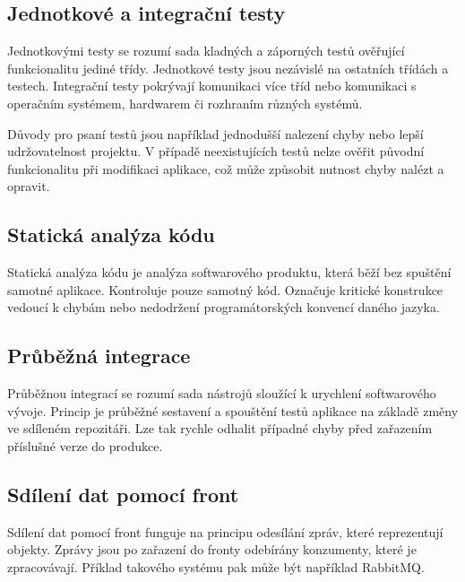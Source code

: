 \documentclass[thesis=B,czech]{FITthesis}[2012/06/26]
\begin{document}
\subsection{Jednotkové a integrační testy}
Jednotkovými testy se rozumí sada kladných a záporných testů ověřující funkcionalitu jediné třídy. Jednotkové testy
jsou nezávislé na ostatních třídách a testech. \cite{testing} 
Integrační testy pokrývají komunikaci více tříd nebo komunikaci s operačním systémem, hardwarem či rozhraním různých systémů. \cite{testing}
\par
Důvody pro psaní testů jsou například jednodušší nalezení chyby nebo lepší udržovatelnost projektu. V případě neexistujících testů nelze ověřit původní
funkcionalitu při modifikaci aplikace, což může způsobit nutnost chyby nalézt a opravit.\cite{testing}

\subsection{Statická analýza kódu}
Statická analýza kódu je analýza softwarového produktu, která běží bez spuštění samotné aplikace. Kontroluje 
pouze samotný kód. Označuje kritické konstrukce vedoucí k chybám nebo nedodržení programátorských konvencí daného
jazyka.
\subsection{Průběžná integrace}
Průběžnou integrací se rozumí sada nástrojů sloužící k urychlení softwarového vývoje. Princip je průběžné sestavení
a spouštění testů aplikace na základě změny ve sdíleném repozitáři. Lze tak rychle odhalit případné chyby před zařazením 
příslušné verze do produkce.\cite{CI}

\subsection{Sdílení dat pomocí front}
Sdílení dat pomocí front funguje na principu odesílání zpráv, které reprezentují objekty. Zprávy jsou po zařazení do fronty odebírány
konzumenty, které je zpracovávají.
Příklad takového systému pak může být například RabbitMQ. \cite{rabbitMQ}
\end{document}
